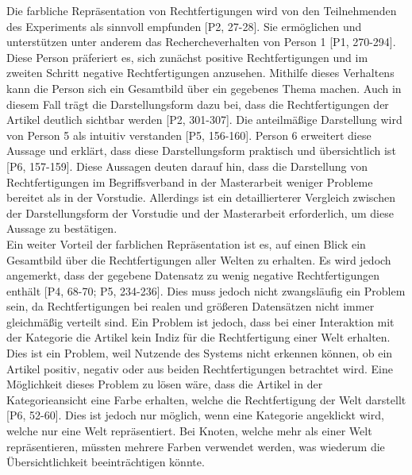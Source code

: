 Die farbliche Repräsentation von Rechtfertigungen wird von den Teilnehmenden des Experiments als sinnvoll empfunden [P2, 27-28].
Sie ermöglichen und unterstützen unter anderem das Rechercheverhalten von Person 1 [P1, 270-294]. %
Diese Person präferiert es, sich zunächst positive Rechtfertigungen und im zweiten Schritt negative Rechtfertigungen anzusehen.
Mithilfe dieses Verhaltens kann die Person sich ein Gesamtbild über ein gegebenes Thema machen.
Auch in diesem Fall trägt die Darstellungsform dazu bei, dass die Rechtfertigungen der Artikel deutlich sichtbar werden [P2, 301-307].
Die anteilmäßige Darstellung wird von Person 5 als intuitiv verstanden [P5, 156-160].
Person 6 erweitert diese Aussage und erklärt, dass diese Darstellungsform praktisch und übersichtlich ist [P6, 157-159].
Diese Aussagen deuten darauf hin, dass die Darstellung von Rechtfertigungen im Begriffsverband in der Masterarbeit weniger Probleme bereitet als in der Vorstudie.
Allerdings ist ein detaillierterer Vergleich zwischen der Darstellungsform der Vorstudie und der Masterarbeit erforderlich, um diese Aussage zu bestätigen. \\

Ein weiter Vorteil der farblichen Repräsentation ist es, auf einen Blick ein Gesamtbild über die Rechtfertigungen aller Welten zu erhalten.
Es wird jedoch angemerkt, dass der gegebene Datensatz zu wenig negative Rechtfertigungen enthält [P4, 68-70; P5, 234-236].
Dies muss jedoch nicht zwangsläufig ein Problem sein, da Rechtfertigungen bei realen und größeren Datensätzen nicht immer gleichmäßig verteilt sind.
Ein Problem ist jedoch, dass bei einer Interaktion mit der Kategorie die Artikel kein Indiz für die Rechtfertigung einer Welt erhalten.
Dies ist ein Problem, weil Nutzende des Systems nicht erkennen können, ob ein Artikel positiv, negativ oder aus beiden Rechtfertigungen betrachtet wird.
Eine Möglichkeit dieses Problem zu lösen wäre, dass die Artikel in der Kategorieansicht eine Farbe erhalten, welche die Rechtfertigung der Welt darstellt [P6, 52-60].
Dies ist jedoch nur möglich, wenn eine Kategorie angeklickt wird, welche nur eine Welt repräsentiert.
Bei Knoten, welche mehr als einer Welt repräsentieren, müssten mehrere Farben verwendet werden, was wiederum die Übersichtlichkeit beeinträchtigen könnte.\\

